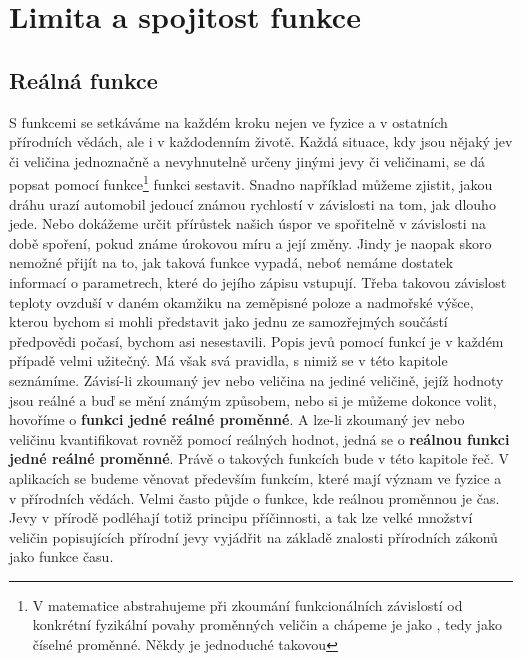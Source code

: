 {
\chapter{Limita a spojitost funkce}\label{mai:IchapIII}
\minitoc

  \section{Reálná funkce}
    \small
    S funkcemi se setkáváme na každém kroku nejen ve fyzice a v ostatních přírodních vědách, ale i 
    v každodenním životě. Každá situace, kdy jsou nějaký jev či veličina jednoznačně a nevyhnutelně 
    určeny jinými jevy či veličinami, se dá popsat pomocí funkce\footnote{V matematice abstrahujeme 
    při zkoumání funkcionálních závislostí od konkrétní fyzikální povahy proměnných veličin a 
    chápeme je jako , tedy jako číselné proměnné. Někdy je jednoduché 
    takovou} funkci sestavit. Snadno například můžeme zjistit, jakou dráhu urazí automobil jedoucí 
    známou rychlostí v závislosti na tom, jak dlouho jede. Nebo dokážeme určit přírůstek našich 
    úspor ve spořitelně v závislosti na době spoření, pokud známe úrokovou míru a její změny. Jindy 
    je naopak skoro nemožné přijít na to, jak taková funkce vypadá, neboť nemáme dostatek informací 
    o parametrech, které do jejího zápisu vstupují. Třeba takovou závislost teploty ovzduší v daném 
    okamžiku na zeměpisné poloze a nadmořské výšce, kterou bychom si mohli představit jako jednu ze 
    samozřejmých součástí předpovědi počasí, bychom asi nesestavili. Popis jevů pomocí funkcí je v 
    každém případě velmi užitečný. Má však svá pravidla, s nimiž se v této kapitole seznámíme. 
    Závisí-li zkoumaný jev nebo veličina na jediné veličině, jejíž hodnoty jsou reálné a buď se 
    mění známým způsobem, nebo si je můžeme dokonce volit, hovoříme o \textbf{funkci jedné reálné 
    proměnné}. A lze-li zkoumaný jev nebo veličinu kvantifikovat rovněž pomocí reálných hodnot, 
    jedná se o \textbf{reálnou funkci jedné reálné proměnné}. Právě o takových funkcích bude v této 
    kapitole řeč. V aplikacích se budeme věnovat především funkcím, které mají význam ve fyzice a v 
    přírodních vědách. Velmi často půjde o funkce, kde reálnou proměnnou je čas. Jevy v přírodě 
    podléhají totiž principu příčinnosti, a tak lze velké množství veličin popisujících přírodní 
    jevy vyjádřit na základě znalosti přírodních zákonů jako funkce času. 
    \cite[s.~53]{Musilova2009MA1}
    \normalsize
}
